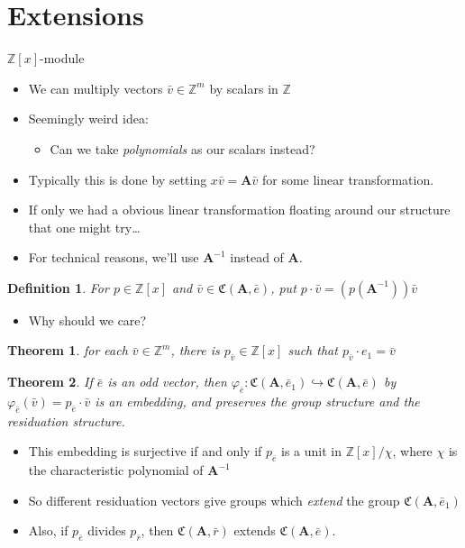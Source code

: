 \documentclass{beamer}
\newtheorem{thm}{Theorem}
\newtheorem{defn}{Definition}
\newcommand{\2}{\textbf{2}}
\newcommand{\Z}{\mathbb{Z}}
\newcommand{\Am}{\textbf{A}}
\newcommand{\e}{\bar{e}}
\renewcommand{\r}{\bar{r}}
\renewcommand{\v}{\bar{v}}
\newcommand{\C}{\mathfrak{C}(\Am,\e)}
\begin{document}
\section{Extensions}
\begin{frame}{$\Z[x]$-module}
  \begin{itemize}
    \item We can multiply vectors $\v \in \Z^m$ by scalars in $\Z$
    \pause
    \item Seemingly weird idea:
    \pause
    \begin{itemize}
      \item Can we take \emph{polynomials} as our scalars instead?
    \end{itemize}
    \pause
    \item Typically this is done by setting $x \v = \Am \v$ for some 
      linear transformation.
    \pause
    \item If only we had a obvious linear transformation floating around our
      structure that one might try\ldots
    \pause
    \item For technical reasons, we'll use $\Am^{-1}$ instead of $\Am$.
  \end{itemize}
  \pause
  \begin{defn}
    For $p \in \Z[x]$ and $\v \in \C$, put $p \cdot \v = (p(\Am^{-1}))\v$
  \end{defn}
\end{frame}

\begin{frame}
  \begin{itemize}
    \item Why should we care?
  \end{itemize}
  \pause
  \begin{thm}
    for each $\v \in \Z^m$, there is $p_{\v} \in \Z[x]$ such that 
    $p_{\v} \cdot e_1 = \v$
  \end{thm}
  \pause
  \begin{thm}
    If $\e$ is an odd vector, then 
    $\varphi_{\e} : \mathfrak{C}(\Am,\e_1) \hookrightarrow \C$ by
    $\varphi_{\e} (\v) = p_{\e} \cdot \v$ is an embedding, and preserves the 
    group structure and the residuation structure.
  \end{thm}
  \pause
  \begin{itemize}
    \item This embedding is surjective if and only if $p_{\e}$ is a unit
      in $\Z[x]/\chi$, where $\chi$ is the characteristic polynomial of $\Am^{-1}$
    \pause
    \item So different residuation vectors give groups which \emph{extend} 
      the group $\mathfrak{C}(\Am,\e_1)$
    \pause
    \item Also, if $p_{\e}$ divides $p_{\r}$, then $\mathfrak{C}(\Am,\r)$
      extends $\mathfrak{C}(\Am,\e)$.
  \end{itemize}
\end{frame}
\end{document}
